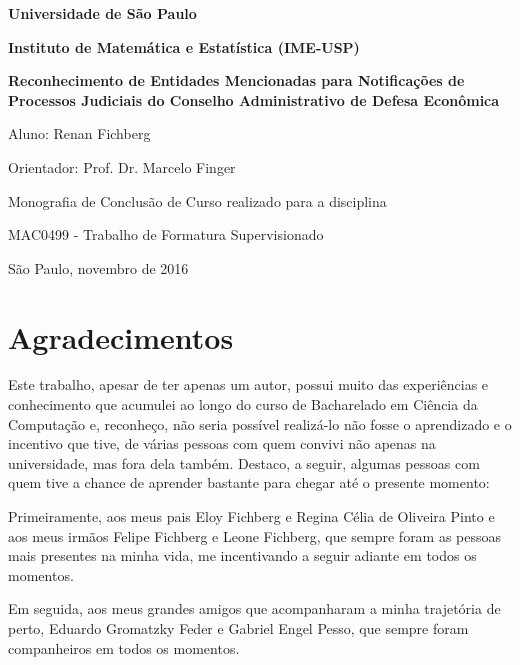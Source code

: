 \documentclass[11pt]{report}
\begin{document}
\begin{center}
  \thispagestyle{empty}
  {\LARGE \textbf{Universidade de São Paulo}}
  \vspace*{10px}

  {\LARGE \textbf{Instituto de Matemática e Estatística (IME-USP)}}
  \vspace*{150px}

  {\Large \textbf{Reconhecimento de Entidades Mencionadas para Notificações de Processos Judiciais do Conselho Administrativo de Defesa Econômica}}
  \vspace*{100px}

  {\Large Aluno: Renan Fichberg}

  \vspace*{1px}
  {\Large Orientador: Prof. Dr. Marcelo Finger}

  \vspace*{150px}
  {\large Monografia de Conclusão de Curso realizado para a disciplina}

  \vspace*{1px}
  {\large MAC0499 - Trabalho de Formatura Supervisionado}

  \vspace*{100px}
  {\large São Paulo, novembro de 2016}
\end{center}

\pagebreak
\thispagestyle{empty}
\chapter*{Agradecimentos}

\indent\indent Este trabalho, apesar de ter apenas um autor, possui muito das experiências e conhecimento que acumulei ao longo
do curso de Bacharelado em Ciência da Computação e, reconheço, não seria possível realizá-lo não fosse o aprendizado e o incentivo que tive, de várias
pessoas com quem convivi não apenas na universidade, mas fora dela também. Destaco, a seguir, algumas pessoas com quem tive a chance de aprender
bastante para chegar até o presente momento:

Primeiramente, aos meus pais Eloy Fichberg e Regina Célia de Oliveira Pinto e aos meus irmãos Felipe Fichberg e Leone Fichberg, que sempre foram
as pessoas mais presentes na minha vida, me incentivando a seguir adiante em todos os momentos.

Em seguida, aos meus grandes amigos que acompanharam a minha trajetória de perto, Eduardo Gromatzky Feder e Gabriel Engel Pesso, que sempre foram companheiros
em todos os momentos.
\end{document}
